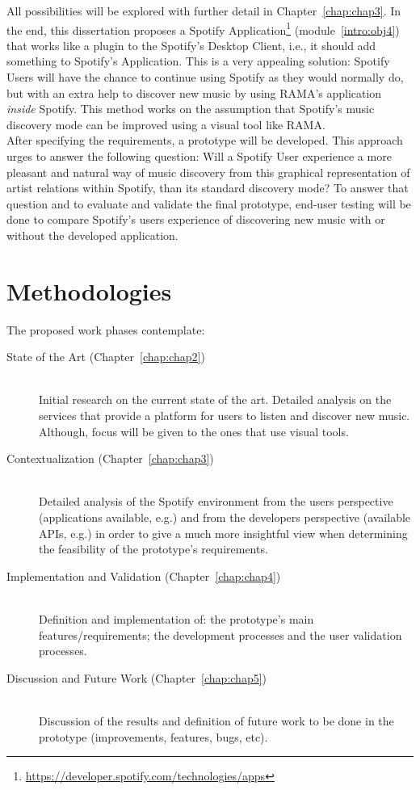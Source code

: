   All possibilities will be explored with further detail in Chapter~\ref{chap:chap3}.
  In the end, this dissertation proposes a Spotify Application\footnote{\url{https://developer.spotify.com/technologies/apps}} (module~\ref{intro:obj4}) that works like a plugin to the Spotify's Desktop Client, i.e., it should add something to Spotify's Application.
  This is a very appealing solution: Spotify Users will have the chance to continue using Spotify as they would normally do, but with an extra help to discover new music by using RAMA's application \emph{inside} Spotify. 
  This method works on the assumption that Spotify's music discovery mode can be improved using a visual tool like RAMA. \\

  After specifying the requirements, a prototype will be developed.
  This approach urges to answer the following question: Will a Spotify User experience a more pleasant and natural way of music discovery from this graphical representation of artist relations within Spotify, than its standard discovery mode?
  To answer that question and to evaluate and validate the final prototype, end-user testing will be done to compare Spotify's users experience of discovering new music with or without the developed application.

\section{Methodologies} %
\label{sec:methodologies}
  
  The proposed work phases contemplate:

  \begin{description}
    \item[State of the Art (Chapter~\ref{chap:chap2})] \hfill \\
      Initial research on the current state of the art.
      Detailed analysis on the services that provide a platform for users to listen and discover new music.
      Although, focus will be given to the ones that use visual tools.
    \item[Contextualization (Chapter~\ref{chap:chap3})] \hfill \\
      Detailed analysis of the Spotify environment from the users perspective (applications available, e.g.) and from the developers perspective (available APIs, e.g.) in order to give a much more insightful view when determining the feasibility of the prototype's requirements.
    \item[Implementation and Validation (Chapter~\ref{chap:chap4})] \hfill \\
      Definition and implementation of: the prototype's main features/requirements; the development processes and the user validation processes.
    \item[Discussion and Future Work (Chapter~\ref{chap:chap5})] \hfill \\
      Discussion of the results and definition of future work to be done in the prototype (improvements, features, bugs, etc).
  \end{description}

